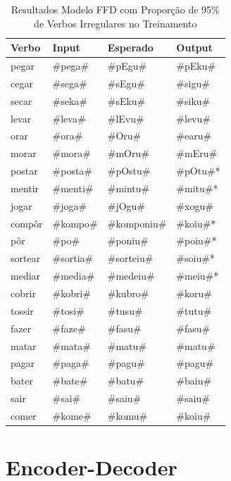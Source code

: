 \begin{table}[H]
\centering
\begin{tabular}{llll}
\textbf{Verbo} & \textbf{Input} & \textbf{Esperado} & \textbf{Output} \\ \hline
pegar & \#pega\# & \#pEgu\# & \#pEku\# \\
cegar & \#sega\# & \#sEgu\# & \#sigu\# \\
secar & \#seka\# & \#sEku\# & \#siku\# \\
levar & \#leva\# & \#lEvu\# & \#levu\# \\
orar & \#ora\# & \#Oru\# & \#earu\# \\
morar & \#mora\# & \#mOru\# & \#mEru\# \\
postar & \#posta\# & \#pOstu\# & \#pOtu\#* \\
mentir & \#menti\# & \#mintu\# & \#mitu\#* \\
jogar & \#joga\# & \#jOgu\# & \#xogu\# \\
compôr & \#kompo\# & \#komponiu\# & \#koiu\#*\\
pôr & \#po\# & \#poniu\# & \#poiu\#*\\
sortear & \#sortia\# & \#sorteiu\# & \#soiu\#*\\
mediar & \#media\# & \#medeiu\# & \#meiu\#*\\
cobrir & \#kobri\# & \#kubro\# & \#koru\#\\
tossir & \#tosi\# & \#tusu\# & \#tutu\# \\
fazer & \#faze\# & \#fasu\# & \#fasu\# \\
matar & \#mata\# & \#matu\# & \#matu\# \\
pagar & \#paga\# & \#pagu\# & \#pagu\# \\
bater & \#bate\# & \#batu\# & \#baiu\# \\
sair & \#sai\# & \#saiu\# & \#saiu\#\\
comer & \#kome\# & \#komu\# & \#koiu\#\\
\end{tabular}
\caption{Resultados Modelo FFD com Proporção de 95\% de Verbos Irregulares no Treinamento}
\label{tab:res}
\end{table}

\section{Encoder-Decoder}
\label{sec:seq2seq}


